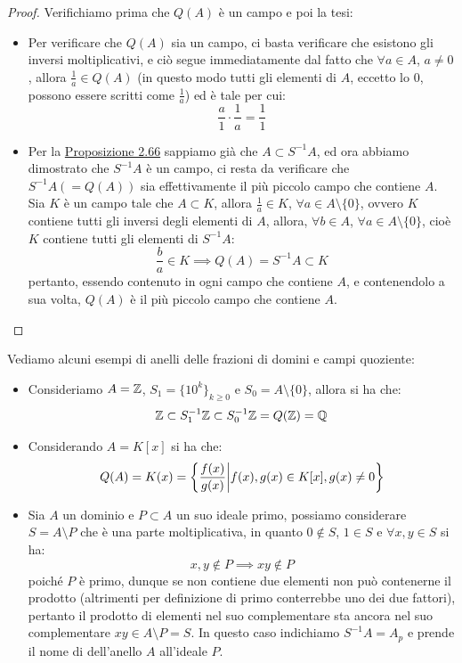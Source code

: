 \documentclass[11pt]{scrartcl}
\begin{document}
\begin{proof}
    Verifichiamo prima che $Q(A)$ è un campo e poi la tesi:
    \begin{itemize}
        \item Per verificare che $Q(A)$ sia un campo, ci basta verificare che esistono gli inversi moltiplicativi, e ciò segue immediatamente
         dal fatto che $\forall a \in A$, $a \ne 0$, allora $\displaystyle\frac{1}{a} \in Q(A)$ (in questo modo tutti gli elementi di $A$, eccetto lo 0,
         possono essere scritti come $\displaystyle\frac{1}{a}$) ed è tale per cui:
            \[ \frac{a}{1} \cdot \frac{1}{a} = \frac{1}{1}
                \]
        \item Per la \hyperref[2.66]{Proposizione 2.66} sappiamo già che $A \subset S^{-1}A$, ed ora abbiamo dimostrato che $S^{-1}A$ è un campo, ci resta da verificare 
        che $S^{-1}A (= Q(A))$ sia effettivamente il più piccolo campo che contiene $A$. Sia $K$ è un campo tale che $A \subset K$, allora $\displaystyle \frac{1}{a} \in K$, $\forall a \in A \setminus\{0\}$, ovvero $K$ 
        contiene tutti gli inversi degli elementi di $A$, allora, $\forall b \in A$, $\forall a \in A \setminus \{0\}$, cioè $K$ contiene tutti gli elementi di $S^{-1}A$:
            \[ \frac{b}{a} \in K \implies Q(A) = S^{-1}A \subset K
                \]
        pertanto, essendo contenuto in ogni campo che contiene $A$, e contenendolo a sua volta, $Q(A)$ è il più piccolo campo che contiene $A$.
    \end{itemize}
\end{proof}

\begin{example}
    Vediamo alcuni esempi di anelli delle frazioni di domini e campi quoziente:
    \begin{itemize}
        \item Consideriamo $A = \mathbb Z$, $S_1 = \{10^k\}_{k\geq 0}$ e $S_0 = A \setminus\{0\}$, allora si ha che:
            \[ \mathbb Z \subset S_1^{-1}\mathbb Z \subset S_0^{-1}\mathbb Z = Q(\mathbb Z) = \mathbb Q
                \]
        \item Considerando $A = K[x]$ si ha che:
            \[ Q(A) = K(x) = \left\{\frac{f(x)}{g(x)} \middle| f(x),g(x) \in K[x], g(x) \ne 0\right\}
                \]
        \item Sia $A$ un dominio e $P \subset A$ un suo ideale primo, possiamo considerare $S = A \setminus P$ che è una parte moltiplicativa, in quanto 
            $0 \not\in S$, $1 \in S$ e $\forall x,y \in S$ si ha:
            \[ x,y \not\in P \implies xy \not\in P
                \]
            poiché $P$ è primo, dunque se non contiene due elementi non può contenerne il prodotto (altrimenti per definizione di primo conterrebbe uno dei due fattori), pertanto il prodotto di elementi nel suo complementare
            sta ancora nel suo complementare $xy \in A \setminus P = S$. In questo caso indichiamo $S^{-1}A = A_p$ e prende il nome di  dell'anello $A$ all'ideale $P$.
    \end{itemize}
\end{example}
\end{document}
